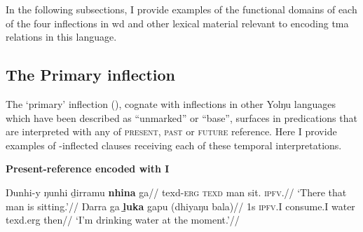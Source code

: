  In the following subsections, I provide examples of the functional domains of each of the four inflections in \acrlong{wd} and other lexical material relevant to encoding \acrshort{tma} relations in this language.

%

\subsection{The Primary inflection}\label{desc-i}

The `primary' inflection (\I), cognate with inflections in other Yolŋu languages which have been described as ``unmarked'' or ``base'', surfaces in predications that are interpreted with any of \textsc{present}, \textsc{past} or \textsc{future} reference. Here I provide examples of \I-inflected clauses receiving each of these temporal interpretations.

\pex\textbf{ Present-reference encoded with \gls{I}}

\a\begingl{}
\gla Ŋunhi-y ŋunhi ḏirramu \textbf{nhina} ga//
\glb \gls{texd}\textsc{-erg} \textsc{texd} man sit.\I{} \textsc{ipfv.\I}//
\glft`There that man is sitting.'// 
\endgl
\a\begingl\gla Ŋarra ga \textbf{ḻuka} gapu (dhiyaŋu bala)//
\glb 1s \textsc{ipfv.\gls{I}} consume.\gls{I} water \gls{texd}.\gls{erg} then//
\glft`I'm drinking water at the moment.'\trailingcitation{[DhG 20190405]}//\endgl
\xe

